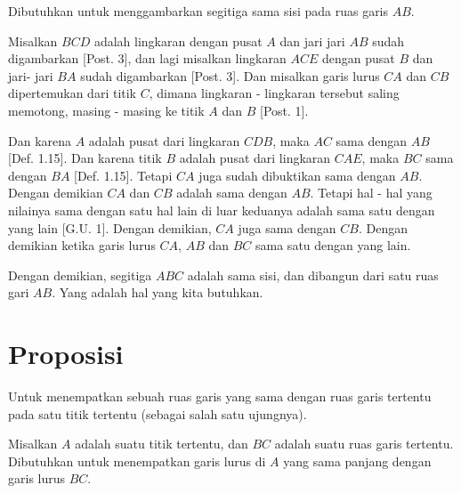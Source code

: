 \documentclass[a4paper]{book}
\begin{document}
Dibutuhkan untuk menggambarkan segitiga sama sisi pada ruas garis $AB$.

Misalkan $BCD$ adalah lingkaran dengan pusat $A$ dan jari jari $AB$ sudah 
digambarkan [Post. 3], dan lagi misalkan lingkaran $ACE$ dengan pusat $B$ 
dan jari- jari $BA$ sudah digambarkan [Post. 3]. Dan misalkan garis lurus 
$CA$ dan $CB$ dipertemukan dari titik $C$, dimana lingkaran - lingkaran 
tersebut saling memotong, masing - masing ke titik $A$ dan $B$ [Post. 1].  


Dan karena $A$ adalah pusat dari lingkaran $CDB$, maka $AC$ sama dengan $AB$
[Def. 1.15]. Dan karena titik $B$ adalah pusat dari lingkaran $CAE$, maka
$BC$ sama dengan $BA$ [Def. 1.15]. Tetapi $CA$ juga sudah dibuktikan sama 
dengan $AB$. Dengan demikian $CA$ dan $CB$ adalah sama dengan $AB$. Tetapi
hal - hal yang nilainya sama dengan satu hal lain di luar keduanya adalah sama
satu dengan yang lain [G.U. 1]. Dengan demikian, $CA$ juga sama dengan $CB$.  
Dengan demikian ketika garis lurus $CA$, $AB$ dan $BC$ sama satu dengan 
yang lain.

Dengan demikian, segitiga $ABC$ adalah sama sisi, dan dibangun dari
satu ruas gari $AB$. Yang adalah hal yang kita butuhkan.  

\section*{\centering Proposisi \thesection} 

Untuk menempatkan sebuah ruas garis yang sama dengan ruas garis tertentu
pada satu titik tertentu (sebagai salah satu ujungnya).


Misalkan $A$ adalah suatu titik tertentu, dan $BC$ adalah suatu ruas garis
tertentu. Dibutuhkan untuk menempatkan garis lurus di $A$ yang sama panjang
dengan garis lurus $BC$.
\end{document}
